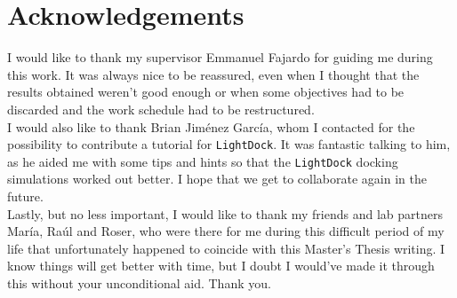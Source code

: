 \documentclass[a4paper,12pt]{article}
\begin{document}

\tableofcontents

\pagebreak


\listoffigures

\pagebreak

\section*{Acknowledgements}

I would like to thank my supervisor Emmanuel Fajardo for guiding me during this work. It was always nice to be reassured, even when I thought that the results obtained weren't good enough or when some objectives had to be discarded and the work schedule had to be restructured.\\

I would also like to thank Brian Jiménez García, whom I contacted for the possibility to contribute a tutorial for \texttt{LightDock}. It was fantastic talking to him, as he aided me with some tips and hints so that the \texttt{LightDock} docking simulations worked out better. I hope that we get to collaborate again in the future.\\

Lastly, but no less important, I would like to thank my friends and lab partners María, Raúl and Roser, who were there for me during this difficult period of my life that unfortunately happened to coincide with this Master's Thesis writing. I know things will get better with time, but I doubt I would've made it through this without your unconditional aid. Thank you.

\pagebreak


\end{document}
